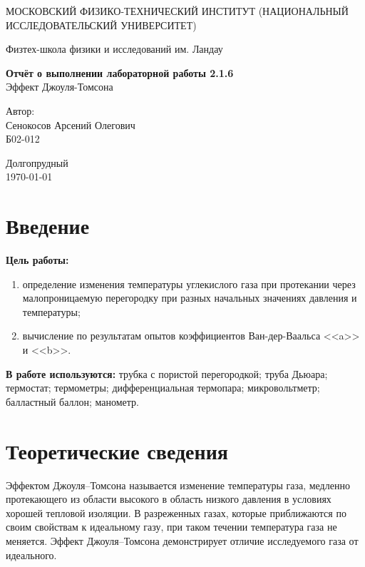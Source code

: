 \documentclass[a4paper,12pt]{article} %
\date{\today}
\begin{document}
\begin{titlepage}
	\begin{center}
		{\large МОСКОВСКИЙ ФИЗИКО-ТЕХНИЧЕСКИЙ ИНСТИТУТ (НАЦИОНАЛЬНЫЙ ИССЛЕДОВАТЕЛЬСКИЙ УНИВЕРСИТЕТ)}
	\end{center}
	\begin{center}
		{\large Физтех-школа физики и исследований им. Ландау}
	\end{center}
	
	
	\vspace{4.5cm}
	{\huge
		\begin{center}
			{\bf Отчёт о выполнении лабораторной работы 2.1.6}\\
			Эффект Джоуля-Томсона
		\end{center}
	}
	\vspace{2cm}
	\begin{flushright}
		{\LARGE Автор:\\ Сенокосов Арсений Олегович \\
			\vspace{0.2cm}
			Б02-012}
	\end{flushright}
	\vspace{8cm}
	\begin{center}
		Долгопрудный\\
		\today
	\end{center}
\end{titlepage}


\section{Введение}
\textbf{Цель работы:}  \begin{enumerate}
	\item определение изменения температуры углекислого газа при протекании через малопроницаемую перегородку при разных начальных значениях давления и температуры;
	\item вычисление по результатам опытов коэффициентов Ван-дер-Ваальса <<a>> и <<b>>.
\end{enumerate}

\textbf{В работе используются:} трубка с пористой перегородкой; труба Дьюара; термостат; термометры; дифференциальная термопара; микровольтметр; балластный баллон; манометр.
\section{Теоретические сведения}

Эффектом Джоуля–Томсона называется изменение температуры газа, медленно протекающего из области высокого в область низкого давления в условиях хорошей тепловой изоляции. В разреженных газах, которые приближаются по своим свойствам к идеальному газу, при таком течении температура газа не меняется. Эффект Джоуля–Томсона демонстрирует отличие исследуемого газа от идеального.
\end{document}
